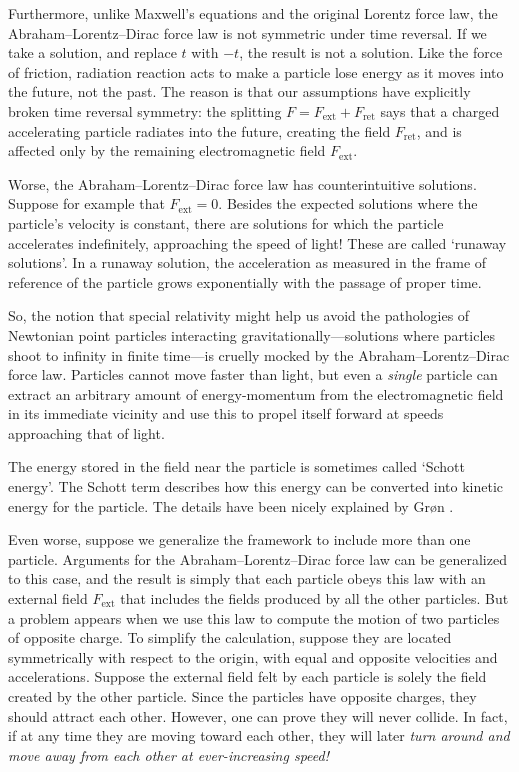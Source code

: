\documentclass[12pt]{article}
\newcommand{\ret}{\mathrm{ret}}
\newcommand{\ext}{\mathrm{ext}}
\begin{document}
Furthermore, unlike Maxwell's equations and the original Lorentz force law, 
the Abraham--Lorentz--Dirac force law is not symmetric under time reversal.   
If we take a solution, and replace $t$ with $-t$, the result is not a solution.  
Like the force of friction, radiation reaction acts to make a particle lose energy as it moves into the future, not the past.  The reason is that our assumptions 
have explicitly broken time reversal symmetry: the splitting $F = F_\ext + F_\ret$ 
says that a charged accelerating particle radiates into the future, creating the field 
$F_\ret$, and is affected only by the remaining electromagnetic field $F_\ext$.

Worse, the Abraham--Lorentz--Dirac force law has counterintuitive solutions.   Suppose for example that $F_\ext = 0$.   Besides the expected solutions where the particle's velocity is constant, there are solutions for which the particle accelerates
indefinitely, approaching the speed of light!   These are called `runaway solutions'.
In a runaway solution, the acceleration as measured in the frame of reference of the particle grows exponentially with the passage of proper time.  

So, the notion that special relativity might help us avoid the pathologies of
Newtonian point particles interacting gravitationally---solutions where 
particles shoot to infinity in finite time---is cruelly mocked by the 
Abraham--Lorentz--Dirac force law.  Particles cannot move faster than light, but even a \emph{single} particle can extract an arbitrary amount of energy-momentum from the electromagnetic field in its immediate vicinity and use this to propel itself forward at speeds approaching that of light.  

The energy stored in the field near the particle is sometimes called `Schott energy'.    The Schott term describes how this energy can be converted into kinetic energy for the particle.  The details have been nicely explained by Gr\o n \cite{Gron}.

Even worse, suppose we generalize the framework to include more than one
particle.  Arguments for the Abraham--Lorentz--Dirac force law can be generalized to  this case, and the result is simply that each particle obeys this law with an 
external field $F_\ext$ that includes the fields produced by all the other particles.  
But a problem appears when we use this law to compute the motion of two particles of opposite charge.   To simplify the calculation, suppose they are located symmetrically with respect to the origin, with equal and opposite velocities and accelerations.   Suppose the external field felt by each particle is solely the field created by the other particle.   Since the particles have opposite charges, they should attract each other.  However, one can prove they will never collide.  In fact, if at any time they are moving toward each other, they will later \emph{turn around and move away from each other at ever-increasing speed!}
\end{document}
